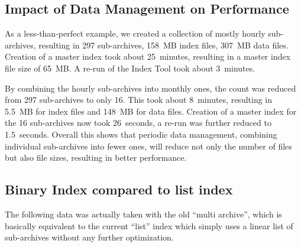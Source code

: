 \subsection{Impact of Data Management on Performance}
As a less-than-perfect example, we created a collection of mostly
hourly sub-archives, resulting in 297 sub-archives, 158~MB index
files, 307~MB data files.  Creation of a master index took about
25~minutes, resulting in a master index file size of 65~MB.  A re-run
of the Index Tool took about 3~minutes.

By combining the hourly sub-archives into monthly ones, the count was
reduced from 297 sub-archives to only 16.  This took about
8~minutes, resulting in 5.5~MB for index files and 148~MB for data
files. Creation of a master index for the 16 sub-archives now took
26~seconds, a re-run was further reduced to 1.5~seconds.
Overall this shows that periodic data management, combining individual
sub-archives into fewer ones, will reduce not only the number of files
but also file sizes, resulting in better performance.

\subsection{Binary Index compared to list index}
The following data was actually taken with the old ``multi archive'',
which is basically equivalent to the current ``list'' index which
simply uses a linear list of sub-archives without any further
optimization.


